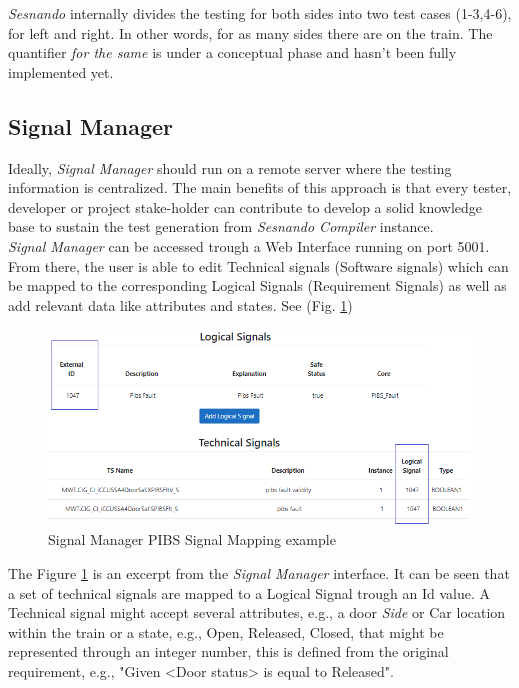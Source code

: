 \textit{Sesnando} internally divides the testing for both sides into two test cases (1-3,4-6), for left and right. In other words, for as many sides there are on the train.
The quantifier \textit{for the same} is under a conceptual phase and hasn't been fully implemented yet.


\subsection{Signal Manager}
\label{subsec:signal_manager}

Ideally, \textit{Signal Manager} should run on a remote server where the testing information is centralized. The main benefits of this approach is that every tester, developer or project stake-holder can contribute to develop a solid knowledge base to sustain the test generation from \textit{Sesnando Compiler} instance.\\

\textit{Signal Manager} can be accessed trough a Web Interface running on port 5001. From there, the user is able to edit Technical signals (Software signals) which can be mapped to the corresponding Logical Signals (Requirement Signals) as well as add relevant data like attributes and states. See (Fig. \ref{fig:signal_manager_pibs})

\begin{figure}[H]
    \centering
    \includegraphics[width=\textwidth]{images/signal_manager_signals_pibs.PNG}
    \caption{Signal Manager PIBS Signal Mapping example}
    \label{fig:signal_manager_pibs}
\end{figure}

The Figure \ref{fig:signal_manager_pibs} is an excerpt from the \textit{Signal Manager} interface. It can be seen that a set of technical signals are mapped to a Logical Signal trough an Id value. A Technical signal might accept several attributes, e.g., a door \textit{Side} or Car location within the train or a state, e.g., Open, Released, Closed, that might be represented through an integer number, this is defined from the original requirement, e.g., "Given <Door status> is equal to Released".


